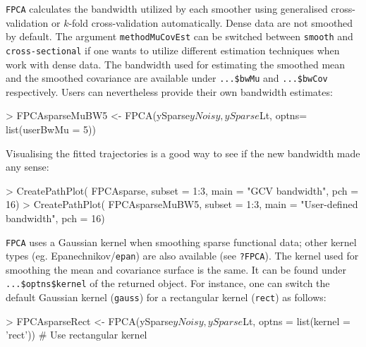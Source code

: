 \documentclass[11pt,english]{article}
\begin{document}
\texttt{FPCA} calculates the bandwidth utilized by each smoother using generalised cross-validation or $k$-fold cross-validation automatically. Dense data are not smoothed by default. The argument \texttt{methodMuCovEst} can be switched between \texttt{smooth} and \texttt{cross-sectional} if one wants to utilize different estimation techniques when work with dense data. 
The bandwidth used for estimating the smoothed mean and the smoothed covariance are available under \texttt{...\$bwMu} and \texttt{...\$bwCov} respectively. Users can nevertheless provide their own bandwidth estimates:
\begin{Schunk}
\begin{Sinput}
>  FPCAsparseMuBW5 <- FPCA(ySparse$yNoisy, ySparse$Lt, optns= list(userBwMu = 5)) 
\end{Sinput}
\end{Schunk}
\vspace{-0.5cm}
Visualising the fitted trajectories is a good way to see if the new bandwidth made any sense:
\begin{Schunk}
\begin{Sinput}
> CreatePathPlot( FPCAsparse, subset = 1:3, main = "GCV bandwidth", pch = 16)
> CreatePathPlot( FPCAsparseMuBW5, subset = 1:3, main = "User-defined bandwidth", pch = 16)
\end{Sinput}
\end{Schunk}
\vspace{-1.1cm}
\texttt{FPCA} uses a Gaussian kernel when smoothing sparse functional data; other kernel types (eg. Epanechnikov/\texttt{epan}) are also available (see \texttt{?FPCA}). The kernel used for smoothing the mean and covariance surface is the same. It can be found under \texttt{...\$optns\$kernel} of the returned object. For instance, one can switch the default Gaussian kernel (\texttt{gauss}) for a rectangular kernel (\texttt{rect}) as follows:

\begin{Schunk}
\begin{Sinput}
>  FPCAsparseRect <- FPCA(ySparse$yNoisy, ySparse$Lt, optns = list(kernel = 'rect')) # Use rectangular kernel
\end{Sinput}
\end{Schunk}
\end{document}
